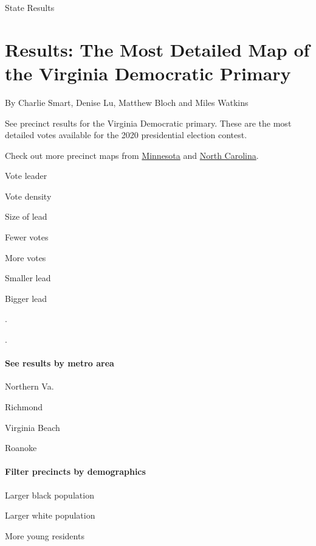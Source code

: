  State Results

\hypertarget{results-the-most-detailed-map-of-the-virginia-democratic-primary-1}{%
\section{Results: The Most Detailed Map of the Virginia Democratic
Primary}\label{results-the-most-detailed-map-of-the-virginia-democratic-primary-1}}

By Charlie Smart, Denise Lu, Matthew Bloch and Miles Watkins

See precinct results for the Virginia Democratic primary. These are the
most detailed votes available for the 2020 presidential election
contest.

Check out more precinct maps from
\href{https://www.nytimes3xbfgragh.onion/interactive/2020/03/03/us/elections/precinct-map-minnesota-primary.html}{Minnesota}
and
\href{https://www.nytimes3xbfgragh.onion/interactive/2020/03/03/us/elections/precinct-map-north-carolina-primary.html}{North
Carolina}.

Vote leader

Vote density

Size of lead

Fewer votes

More votes

Smaller lead

Bigger lead

.

.

\hypertarget{see-results-by-metro-area}{%
\paragraph{See results by metro area}\label{see-results-by-metro-area}}

Northern Va.

Richmond

Virginia Beach

Roanoke

\hypertarget{filter-precincts-by-demographics}{%
\paragraph{Filter precincts by
demographics}\label{filter-precincts-by-demographics}}

Larger black population

Larger white population

More young residents

